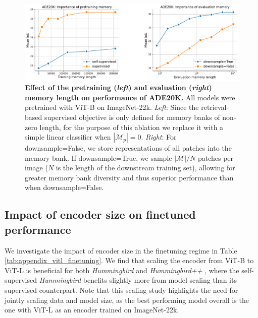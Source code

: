 \documentclass{article}
\newcommand{\ours}{\textit{Hummingbird} }
\newcommand{\oursup}{\textit{Hummingbird}\textit{++} }
\begin{document}
\begin{figure}[ht]
  \begin{center}
    \includegraphics[width=\textwidth]{figures/mem_length_ade20k.pdf}
  \end{center}
\vspace{-1em}
\caption{\textbf{Effect of the pretraining (\textit{left}) and evaluation (\textit{right}) memory length on performance of ADE20K.} All models were pretrained with ViT-B on ImageNet-22k. \textit{Left}: Since the retrieval-based supervised objective is only defined for memory banks of non-zero length, for the purpose of this ablation we replace it with a simple linear classifier when $|\mathcal{M}_p|\!=\!0$. \textit{Right}:  For downsample=False, we store representations of all patches into the memory bank. If downsample=True, we sample $|\mathcal{M}|/ N$ patches per image ($N$ is the length of the downstream training set), allowing for greater memory bank diversity and thus superior performance than when downsample=False.
  \vspace{-0.5em}}
\label{fig:memlengthallade20k}
\end{figure}

\subsection{Impact of encoder size on finetuned performance}
\label{sec:app-vitl-finetuning}

We investigate the impact of encoder size in the finetuning regime in Table \ref{tab:appendix_vitl_finetuning}. We find that scaling the encoder from ViT-B to ViT-L is beneficial for both \ours and \oursup\hspace{-0.2em}, where the self-supervised \ours benefits slightly more from model scaling than its supervised counterpart. Note that this scaling study highlights the need for jointly scaling data and model size, as the best performing model overall is the one with ViT-L as an encoder trained on ImageNet-22k.


\end{document}
